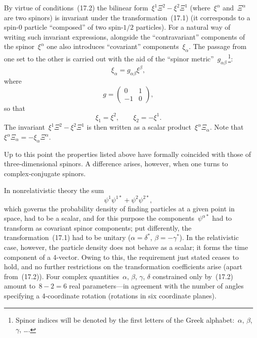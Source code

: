 By virtue of conditions~(17.2) the bilinear form~$\xi^1\Xi^2 - \xi^2\Xi^1$ (where~$\xi^\alpha$ and~$\Xi^\alpha$ are two spinors) is invariant under the transformation~(17.1) (it corresponds to a spin-0 particle ``composed'' of two spin-$1/2$ particles). For a natural way of writing such invariant expressions, alongside the ``contravariant'' components
of the spinor~$\xi^\alpha$ one also introduces ``covariant'' components~$\xi_\alpha$. The passage from one set to the other is carried out with the aid of the ``spinor metric''~$g_{\alpha\beta}$\,\footnote{Spinor indices will be denoted by the first letters of the Greek alphabet:~$\alpha$, $\beta$, $\gamma$, \ldots\;.}:
\begin{equation}
\xi_\alpha = g_{\alpha\beta}\xi^\beta,
\tag{17.3}
\end{equation}
where
\begin{equation}
g = \begin{pmatrix} 0 & 1 \\ -1 & 0 \end{pmatrix},
\tag{17.4}
\end{equation}
so that
\begin{equation}
\xi_1 = \xi^2, \qquad \xi_2 = -\xi^1.
\tag{17.5}
\end{equation}
The invariant~$\xi^1\Xi^2 - \xi^2\Xi^1$ is then written as a scalar product~$\xi^\alpha\Xi_\alpha$. Note that~$\xi^\alpha\Xi_\alpha = -\xi_\alpha\Xi^\alpha$.

Up to this point the properties listed above have formally coincided with those of three-dimensional spinors. A difference arises, however, when one turns to complex-conjugate spinors.

In nonrelativistic theory the sum
\begin{equation}
\psi^1\psi^{1*} + \psi^2\psi^{2*},
\tag{17.6}
\end{equation}
which governs the probability density of finding particles at a given point in space, had to be a scalar, and for this purpose the components~$\psi^{\alpha*}$ had to transform as covariant spinor components; put differently, the transformation~(17.1) had to be unitary ($\alpha = \delta^*$, $\beta = -\gamma^*$). In the relativistic case, however, the particle density does not behave as a scalar; it forms the time component of a 4-vector. Owing to this, the requirement just stated ceases to hold, and no further restrictions on the transformation coefficients arise (apart from~(17.2)). Four complex quantities~$\alpha$, $\beta$, $\gamma$, $\delta$ constrained only by~(17.2) amount to~$8 - 2 = 6$ real parameters---in agreement with the number of angles specifying a 4-coordinate rotation (rotations in six coordinate planes).

